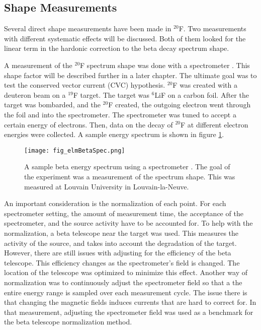 \documentclass[../MaxHughesThesis.tex]{subfiles}
\begin{document}
\subsection{Shape Measurements} 

Several direct shape measurements have been made in $^{20}$F.
Two measurements with different systematic effects will be discussed.
Both of them looked for the linear term in the hardonic correction to the beta decay spectrum shape. 

A measurement of the $^{20}$F spectrum shape was done with a spectrometer \cite{Elm87}.
This shape factor will be described further in a later chapter.
The ultimate goal was to test the conserved vector current (CVC) hypothesis. 
$^{20}$F was created with a deuteron beam on a $^{19}$F target.
The target was $^{6}$LiF on a carbon foil.
After the target was bombarded, and the $^{20}$F created, the outgoing electron went through the foil and into the spectrometer.
The spectrometer was tuned to accept a certain energy of electrons. 
Then, data on the decay of $^{20}$F at different electron energies were collected.
A sample energy spectrum is shown in figure \ref{fig:elmspec}.

\begin{figure}[!htb]
	\centerline{\texttt{[image: fig\_elmBetaSpec.png]}}
	\caption{A sample beta energy spectrum using a spectrometer \cite{Elm87}.
		 The goal of the experiment was a measurement of the spectrum shape.
		 This was measured at Louvain University in Louvain-la-Neuve.
		 }
	\label{fig:elmspec}
\end{figure}

An important consideration is the normalization of each point.
For each spectrometer setting, the amount of measurement time, the acceptance of the spectrometer, and the source activity have to be accounted for.
To help with the normalization, a beta telescope near the target was used.
This measures the activity of the source, and takes into account the degradation of the target.
However, there are still issues with adjusting for the efficiency of the beta telescope.
This efficiency changes as the spectrometer's field is changed.
The location of the telescope was optimized to minimize this effect.
Another way of normalization was to continuously adjust the spectrometer field so that a the entire energy range is sampled over each measurement cycle.
The issue there is that changing the magnetic fields induces currents that are hard to correct for. 
In that measurement, adjusting the spectrometer field was used as a benchmark for the beta telescope normalization method.
\end{document}
